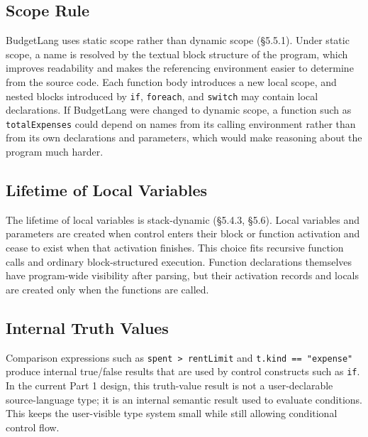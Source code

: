 \documentclass[11pt]{article}
\begin{document}
\subsection*{Scope Rule}
BudgetLang uses static scope rather than dynamic scope (\S5.5.1). Under static scope, a name is resolved by the textual block structure of the program, which improves readability and makes the referencing environment easier to determine from the source code. Each function body introduces a new local scope, and nested blocks introduced by \texttt{if}, \texttt{foreach}, and \texttt{switch} may contain local declarations. If BudgetLang were changed to dynamic scope, a function such as \texttt{totalExpenses} could depend on names from its calling environment rather than from its own declarations and parameters, which would make reasoning about the program much harder.

\subsection*{Lifetime of Local Variables}
The lifetime of local variables is stack-dynamic (\S5.4.3, \S5.6). Local variables and parameters are created when control enters their block or function activation and cease to exist when that activation finishes. This choice fits recursive function calls and ordinary block-structured execution. Function declarations themselves have program-wide visibility after parsing, but their activation records and locals are created only when the functions are called.

\subsection*{Internal Truth Values}
Comparison expressions such as \texttt{spent > rentLimit} and \texttt{t.kind == "expense"} produce internal true/false results that are used by control constructs such as \texttt{if}. In the current Part 1 design, this truth-value result is not a user-declarable source-language type; it is an internal semantic result used to evaluate conditions. This keeps the user-visible type system small while still allowing conditional control flow.
\end{document}
